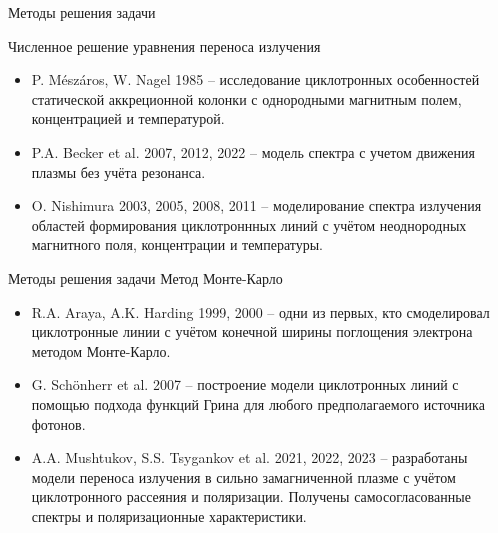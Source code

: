\documentclass{beamer}
\begin{document}
\begin{frame}{Методы решения задачи}
	
	Численное решение уравнения переноса излучения
	\begin{itemize}
		\item[-]  
		P. M\'esz\'aros, W. Nagel 1985 -- исследование циклотронных особенностей статической аккреционной колонки с однородными магнитным полем, концентрацией и температурой.
		\item[-] 
		P.A. Becker et al. 2007, 2012, 2022 -- модель спектра с учетом движения плазмы без учёта резонанса.  

		\item[-]
		O. Nishimura 2003, 2005, 2008, 2011  -- моделирование спектра излучения областей формирования циклотроннных линий с учётом неоднородных магнитного поля, концентрации и температуры.
		
	\end{itemize}
\end{frame}
\begin{frame}{Методы решения задачи}
	Метод Монте-Карло
	\begin{itemize}		
		\item[-]
		R.A. Araya, A.K. Harding 1999, 2000 -- одни из первых, кто смоделировал циклотронные линии с учётом конечной ширины поглощения электрона методом Монте-Карло.
		\item[-]
		G. Sch\"onherr et al. 2007 -- построение модели циклотронных линий с помощью подхода функций Грина для любого предполагаемого источника фотонов.
		\item[-] 
		A.A. Mushtukov, S.S. Tsygankov et al. 2021, 2022, 2023 -- разработаны модели переноса излучения в сильно замагниченной плазме с учётом циклотронного рассеяния и поляризации. Получены самосогласованные спектры и поляризационные характеристики.
	\end{itemize}
\end{frame}
\end{document}
